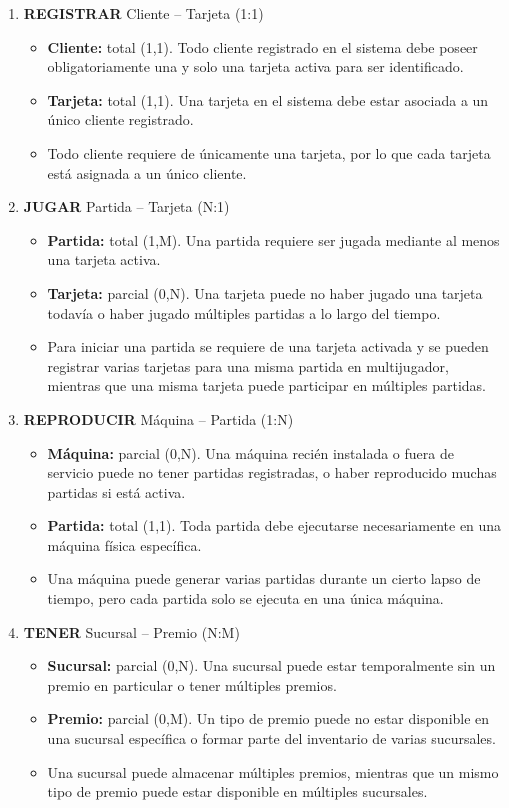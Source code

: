 \documentclass[12pt]{article}
\begin{document}
\begin{enumerate}
    \item \textbf{REGISTRAR} Cliente -- Tarjeta (1:1)
    \begin{itemize}
        \item \textbf{Cliente:} total (1,1). Todo cliente registrado en el sistema debe poseer obligatoriamente una y solo una tarjeta activa para ser identificado.
        \item \textbf{Tarjeta:} total (1,1). Una tarjeta en el sistema debe estar asociada a un único cliente registrado.
        \item Todo cliente requiere de únicamente una tarjeta, por lo que cada tarjeta está asignada a un único cliente.
    \end{itemize}

    \item \textbf{JUGAR} Partida -- Tarjeta (N:1)
    \begin{itemize}
        \item \textbf{Partida:} total (1,M). Una partida requiere ser jugada mediante al menos una tarjeta activa.
        \item \textbf{Tarjeta:} parcial (0,N). Una tarjeta puede no haber jugado una tarjeta todavía o haber jugado múltiples partidas a lo largo del tiempo.
        \item Para iniciar una partida se requiere de una tarjeta activada y se pueden registrar varias tarjetas para una misma partida en multijugador, mientras que una misma tarjeta puede participar en múltiples partidas.
    \end{itemize}

    \item \textbf{REPRODUCIR} Máquina -- Partida (1:N)
    \begin{itemize}
        \item \textbf{Máquina:} parcial (0,N). Una máquina recién instalada o fuera de servicio puede no tener partidas registradas, o haber reproducido muchas partidas si está activa.
        \item \textbf{Partida:} total (1,1). Toda partida debe ejecutarse necesariamente en una máquina física específica.
        \item Una máquina puede generar varias partidas durante un cierto lapso de tiempo, pero cada partida solo se ejecuta en una única máquina.
    \end{itemize}

    \item \textbf{TENER} Sucursal -- Premio (N:M)
    \begin{itemize}
        \item \textbf{Sucursal:} parcial (0,N). Una sucursal puede estar temporalmente sin un premio en particular o tener múltiples premios.
        \item \textbf{Premio:} parcial (0,M). Un tipo de premio puede no estar disponible en una sucursal específica o formar parte del inventario de varias sucursales.
        \item Una sucursal puede almacenar múltiples premios, mientras que un mismo tipo de premio puede estar disponible en múltiples sucursales.
    \end{itemize}


\end{enumerate}
\end{document}
